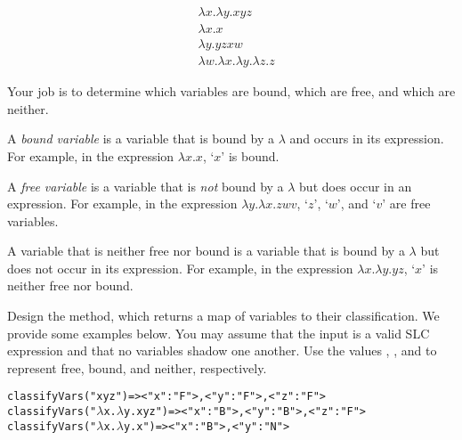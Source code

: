 
\begin{align*}
  & \lambda{}x.\lambda{y}.xyz\\
  & \lambda{x}.x\\
  & \lambda{y}.yzxw\\
  & \lambda{w}.\lambda{x}.\lambda{y}.\lambda{z}.z
\end{align*}

Your job is to determine which variables are bound, which are free, and which are neither.

A \textit{bound variable} is a variable that is bound by a $\lambda$ and occurs in its expression. For example, in the expression $\lambda{x}.x$, `$x$' is bound.

A \textit{free variable} is a variable that is \textit{not} bound by a $\lambda$ but does occur in an expression. For example, in the expression $\lambda{y}.\lambda{x}.zwv$, `$z$', `$w$', and `$v$' are free variables.

A variable that is neither free nor bound is a variable that is bound by a $\lambda$ but does not occur in its expression. For example, in the expression $\lambda{}x.\lambda{}y.yz$, `$x$' is neither free nor bound.

Design the  method, which returns a map of variables to their classification. We provide some examples below. You may assume that the input is a valid SLC expression and that no variables shadow one another. Use the values , , and  to represent free, bound, and neither, respectively.
\begin{alltt}
classifyVars("xyz")       => {<"x" : "F">, <"y" : "F">, <"z" : "F">}
classifyVars("\(\lambda\)x.\(\lambda\)y.xyz") => {<"x" : "B">, <"y" : "B">, <"z" : "F">}
classifyVars("\(\lambda\)x.\(\lambda\)y.x")   => {<"x" : "B">, <"y" : "N">}
\end{alltt}

